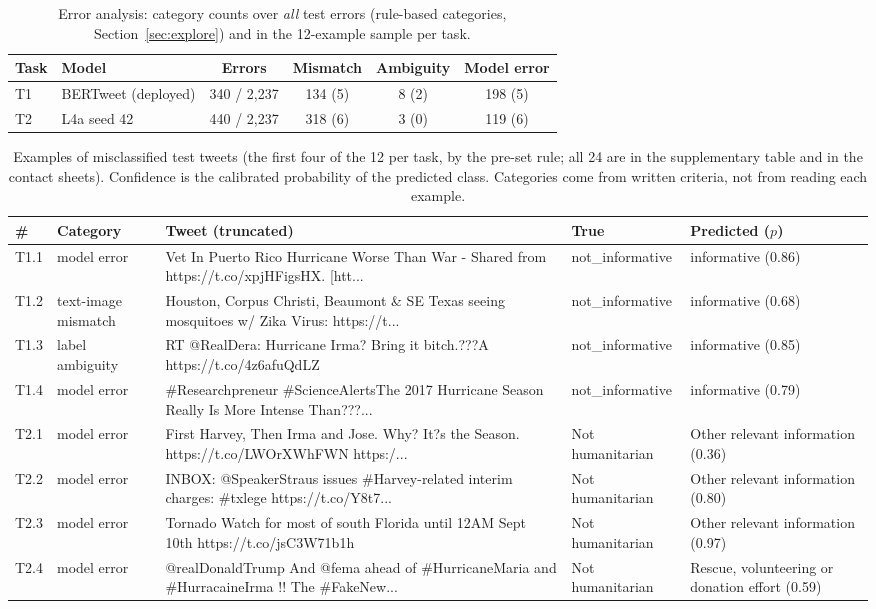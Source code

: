 \documentclass[conference]{IEEEtran}
\begin{document}
\begin{table}[t]
\centering
\caption{Error analysis: category counts over \emph{all} test errors (rule-based categories, Section~\ref{sec:explore}) and in the 12-example sample per task.}
\label{tab:errcounts}
\footnotesize
\setlength{\tabcolsep}{3pt}
\begin{tabular}{llcccc}
\toprule
Task & Model & Errors & Mismatch & Ambiguity & Model error \\
\midrule
T1 & BERTweet (deployed) & 340 / 2,237 & 134 (5) & 8 (2) & 198 (5) \\
T2 & L4a seed 42 & 440 / 2,237 & 318 (6) & 3 (0) & 119 (6) \\
\bottomrule
\end{tabular}
\end{table}

\begin{table}[t]
\centering
\caption{Examples of misclassified test tweets (the first four of the 12 per task, by the pre-set rule; all 24 are in the supplementary table and in the contact sheets). Confidence is the calibrated probability of the predicted class. Categories come from written criteria, not from reading each example.}
\label{tab:errex}
\scriptsize
\setlength{\tabcolsep}{3pt}
\begin{tabular}{llp{6.2cm}p{2.9cm}p{3.4cm}}
\toprule
\# & Category & Tweet (truncated) & True & Predicted ($p$) \\
\midrule
T1.1 & model error & Vet In Puerto Rico Hurricane Worse Than War - Shared from https://t.co/xpjHFigsHX. [htt... & not\_informative & informative (0.86) \\
T1.2 & text-image mismatch & Houston, Corpus Christi, Beaumont \& SE Texas seeing mosquitoes w/ Zika Virus: https://t... & not\_informative & informative (0.68) \\
T1.3 & label ambiguity & RT @RealDera: Hurricane Irma? Bring it bitch.???A https://t.co/4z6afuQdLZ & not\_informative & informative (0.85) \\
T1.4 & model error & \#Researchpreneur \#ScienceAlertsThe 2017 Hurricane Season Really Is More Intense Than???... & not\_informative & informative (0.79) \\
\midrule
T2.1 & model error & First Harvey, Then Irma and Jose. Why? It?s the Season. https://t.co/LWOrXWhFWN https:/... & Not humanitarian & Other relevant information (0.36) \\
T2.2 & model error & INBOX: @SpeakerStraus issues \#Harvey-related interim charges: \#txlege https://t.co/Y8t7... & Not humanitarian & Other relevant information (0.80) \\
T2.3 & model error & Tornado Watch for most of south Florida until 12AM Sept 10th https://t.co/jsC3W71b1h & Not humanitarian & Other relevant information (0.97) \\
T2.4 & model error & @realDonaldTrump And @fema ahead of \#HurricaneMaria and \#HurracaineIrma !! The \#FakeNew... & Not humanitarian & Rescue, volunteering or donation effort (0.59) \\
\bottomrule
\end{tabular}
\end{table}
\end{document}
